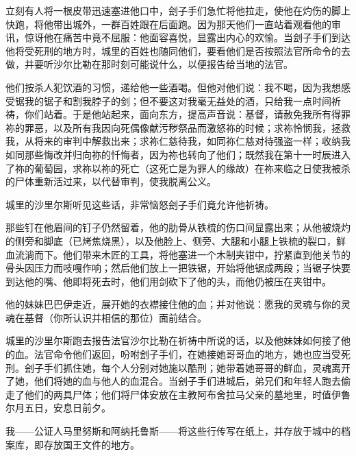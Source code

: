 立刻有人将一根皮带迅速塞进他口中，刽子手们急忙将他拉走，使他在灼伤的脚上快跑，将他带出城外，一群百姓跟在后面跑。因为那天他们一直站着观看他的审讯，惊讶他在痛苦中竟不屈服：他面容喜悦，显露出内心的欢愉。当刽子手们到达他将受死刑的地方时，城里的百姓也随同他们，要看他们是否按照法官所命令的去做，并要听沙尔比勒在那时刻可能说什么，以便报告给当地的法官。\par

他们按杀人犯饮酒的习惯，递给他一些酒喝。但他对他们说：我不喝，因为我想感受锯我的锯子和割我脖子的剑；但不要这对我毫无益处的酒，只给我一点时间祈祷，你们站着。于是他站起来，面向东方，提高声音说：基督，请赦免我所有得罪祢的罪恶，以及所有我因向死偶像献污秽祭品而激怒祢的时候；求祢怜悯我，拯救我，从将来的审判中解救出来；求祢仁慈待我，如同祢仁慈对待强盗一样；收纳我如同那些悔改并归向祢的忏悔者，因为祢也转向了他们；既然我在第十一时辰进入了祢的葡萄园，求祢以祢的死亡（这死亡是为罪人的缘故）在祢来临之日使我被杀的尸体重新活过来，以代替审判，使我脱离公义。\par

城里的沙里尔斯听见这些话，非常恼怒刽子手们竟允许他祈祷。\par

那些钉在他眉间的钉子仍然留着，他的肋骨从铁梳的伤口间显露出来；从他被烧灼的侧旁和脚底（已烤焦烧黑），以及他脸上、侧旁、大腿和小腿上铁梳的裂口，鲜血流淌而下。他们带来木匠的工具，将他塞进一个木制夹钳中，拧紧直到他关节的骨头因压力而吱嘎作响；然后他们放上一把铁锯，开始将他锯成两段；当锯子快要到达他的嘴、他即将死去时，他们用剑砍下了他的头，而他仍被压在夹钳中。\par

他的妹妹巴巴伊走近，展开她的衣襟接住他的血；并对他说：愿我的灵魂与你的灵魂在基督（你所认识并相信的那位）面前结合。\par

城里的沙里尔斯跑去报告法官沙尔比勒在祈祷中所说的话，以及他妹妹如何接了他的血。法官命令他们返回，吩咐刽子手们，在她接她哥哥血的地方，她也应当受死刑。刽子手们抓住她，每个人分别对她施以酷刑；她带着她哥哥的鲜血，灵魂离开了她，他们将她的血与他人的血混合。当刽子手们进城后，弟兄们和年轻人跑去偷走了他们的两具尸体；他们将尸体安放在主教阿布舍拉马父亲的墓地里，时值伊鲁尔月五日，安息日前夕。\par

我——公证人马里努斯和阿纳托鲁斯——将这些行传写在纸上，并存放于城中的档案库，即存放国王文件的地方。\par

